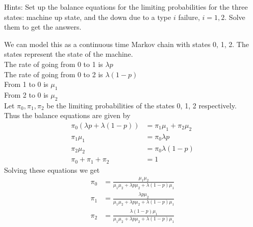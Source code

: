 \documentclass[answers,12pt,addpoints]{exam}
\begin{document}
\begin{questions}
    Hints: Set up the balance equations for the limiting probabilities for the three states: machine up
    state, and the down due to a type $i$ failure, $i = 1, 2$. Solve them to get the answers.
    \begin{solution}
        We can model this as a continuous time Markov chain with states 0, 1, 2. The states represent the state of the machine. \\
        The rate of going from 0 to 1 is $\lambda p$\\
        The rate of going from 0 to 2 is $\lambda (1-p)$\\
        From 1 to 0 is $\mu_1$\\
        From 2 to 0 is $\mu_2$\\
        Let $\pi_0, \pi_1, \pi_2$ be the limiting probabilities of the states 0, 1, 2 respectively.\\
        Thus the balance equations are given by
        \begin{align*}
            \pi_0 (\lambda p + \lambda (1-p)) &= \pi_1 \mu_1 + \pi_2 \mu_2\\
            \pi_1 \mu_1 &= \pi_0 \lambda p\\
            \pi_2 \mu_2 &= \pi_0 \lambda (1-p)\\
            \pi_0 + \pi_1 + \pi_2 &= 1
        \end{align*}
        Solving these equations we get
        \begin{align*}
            \pi_0 &= \frac{\mu_1 \mu_2}{\mu_1 \mu_2 + \lambda p \mu_2 + \lambda (1-p) \mu_1}\\
            \pi_1 &= \frac{\lambda p \mu_2}{\mu_1 \mu_2 + \lambda p \mu_2 + \lambda (1-p) \mu_1}\\
            \pi_2 &= \frac{\lambda (1-p) \mu_1}{\mu_1 \mu_2 + \lambda p \mu_2 + \lambda (1-p) \mu_1}
        \end{align*}


\end{solution}
\end{questions}
\end{document}
